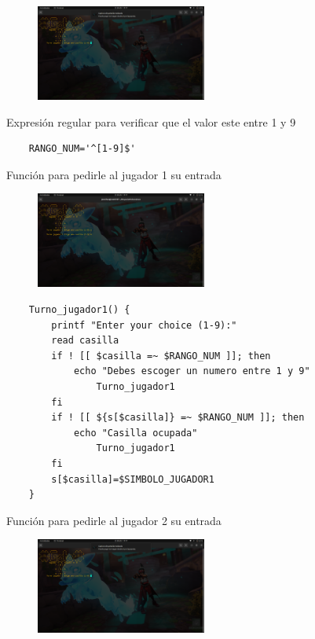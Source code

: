 \documentclass[letterpaper,12pt]{article} %
\begin{document}
\begin{figure}[H]
    \centering
    \includegraphics[width=0.5\textwidth]{figurasShell/Jugar2.png}
\end{figure}

    Expresión regular para verificar que el valor este entre 1 y 9
\begin{verbatim}
    RANGO_NUM='^[1-9]$'
\end{verbatim}
    Función para pedirle al jugador 1 su entrada

    \begin{figure}[H]
        \centering
        \includegraphics[width=0.5\textwidth]{figurasShell/Jugar3.png}
    \end{figure}
\begin{verbatim}
    Turno_jugador1() {
        printf "Enter your choice (1-9):"
        read casilla
        if ! [[ $casilla =~ $RANGO_NUM ]]; then
            echo "Debes escoger un numero entre 1 y 9"
                Turno_jugador1
        fi
        if ! [[ ${s[$casilla]} =~ $RANGO_NUM ]]; then
            echo "Casilla ocupada"
                Turno_jugador1
        fi
        s[$casilla]=$SIMBOLO_JUGADOR1
    }
\end{verbatim}
    Función para pedirle al jugador 2 su entrada

    \begin{figure}[H]
        \centering
        \includegraphics[width=0.5\textwidth]{figurasShell/Jugar4.png}
    \end{figure}
    
\end{document}
